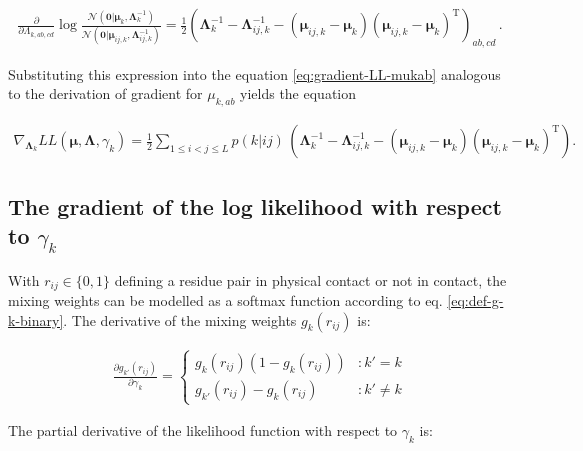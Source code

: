 \documentclass[12pt,a4paper,twoside]{book}
\newcommand{\Gauss}{\mathcal{N}}
\newcommand{\Lijk}{\mathbf{\Lambda}_{ij,k}}
\newcommand{\Lk}{\mathbf{\Lambda}_k}
\newcommand{\muijk}{\mathbf{\mu}_{ij,k}}
\newcommand{\muk}{\mathbf{\mu}_k}
\newcommand{\rij}{r_{ij}}
\theoremstyle{definition}
\theoremstyle{definition}
\theoremstyle{remark}
\begin{document}
\begin{align}
     \frac{\partial}{\partial \Lambda_{k,ab,cd}} \log \frac{  \Gauss(\mathbf{0} | \muk, \Lk^{-1})}{\Gauss( \mathbf{0} | \muijk, \Lijk^{-1})} 
    = \frac{1}{2} \left( \Lk^{-1} - \Lijk^{-1} - (\muijk - \muk) (\muijk - \muk)^\mathrm{T} \right)_{ab,cd}\,.
\end{align}

Substituting this expression into the equation
\eqref{eq:gradient-LL-mukab} analogous to the derivation of gradient for
\(\mu_{k,ab}\) yields the equation

\begin{align}
    \nabla_{\Lk}  L\!L(\mathbf{\mu}, \mathbf{\Lambda}, \gamma_k)
    =  \frac{1}{2} \sum_{1\le i<j\le L}  p(k|ij)  \, 
        \left( \Lk^{-1} - \Lijk^{-1} - (\muijk - \muk) (\muijk - \muk)^\mathrm{T} \right). 
\label{eq:gradient-lambdak-final}
\end{align}

\subsection{\texorpdfstring{The gradient of the log likelihood with
respect to
\(\gamma_k\)}{The gradient of the log likelihood with respect to \textbackslash{}gamma\_k}}\label{the-gradient-of-the-log-likelihood-with-respect-to-gamma_k}

With \(\rij \in \{0,1\}\) defining a residue pair in physical contact or
not in contact, the mixing weights can be modelled as a softmax function
according to eq. \eqref{eq:def-g-k-binary}. The derivative of the mixing
weights \(g_k(\rij)\) is:

\begin{eqnarray}
\frac{\partial g_{k'}(\rij)} {\partial \gamma_k} = \left\{
  \begin{array}{lr}
    g_k(\rij) (1 - g_k(\rij)) & : k' = k\\
    g_{k'}(\rij) - g_k(\rij)  & : k' \neq k
  \end{array}
  \right.
\end{eqnarray}

The partial derivative of the likelihood function with respect to
\(\gamma_k\) is:
\end{document}
